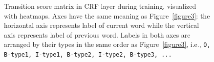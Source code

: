 \begin{figure}
\centering
{}
\caption{Transition score matrix in CRF layer during training, visualized with heatmaps. Axes have the same meaning as Figure~\ref{figure3}: the horizontal axis represents label of current word while the vertical axis represents label of previous word. Labels in both axes are arranged by their types in the same order as Figure~\ref{figure3}, i.e., \texttt{O, B-type1, I-type1, B-type2, I-type2, B-type3, ...}}
\label{figure4}
\end{figure}